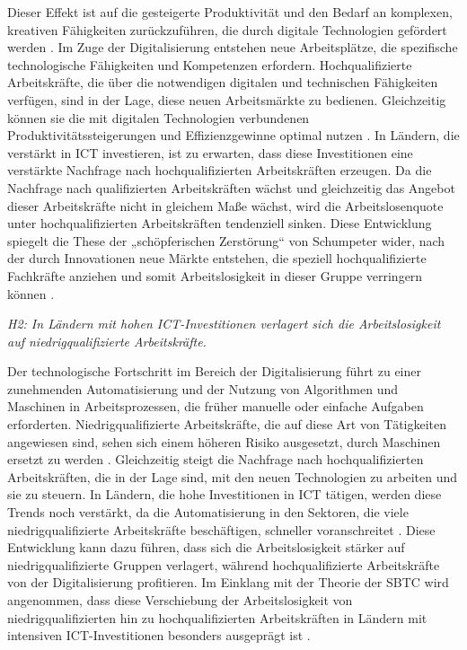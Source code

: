 Dieser Effekt ist auf die gesteigerte Produktivität und den Bedarf an komplexen, kreativen 
Fähigkeiten zurückzuführen, die durch digitale Technologien gefördert werden 
\parencite[vgl.][S. 5–8]{acemoglu2002technical}. Im Zuge der Digitalisierung entstehen neue 
Arbeitsplätze, die spezifische technologische Fähigkeiten und Kompetenzen erfordern. 
Hochqualifizierte Arbeitskräfte, die über die notwendigen digitalen und technischen 
Fähigkeiten verfügen, sind in der Lage, diese neuen Arbeitsmärkte zu bedienen. Gleichzeitig 
können sie die mit digitalen Technologien verbundenen Produktivitätssteigerungen und 
Effizienzgewinne optimal nutzen \parencite[vgl.][Kap. 2]{brynjolfsson2014thesecond}. In 
Ländern, die verstärkt in \ac{ICT} investieren, ist zu erwarten, dass diese Investitionen 
eine verstärkte Nachfrage nach hochqualifizierten Arbeitskräften erzeugen. Da die Nachfrage 
nach qualifizierten Arbeitskräften wächst und gleichzeitig das Angebot dieser Arbeitskräfte 
nicht in gleichem Maße wächst, wird die Arbeitslosenquote unter hochqualifizierten 
Arbeitskräften tendenziell sinken. Diese Entwicklung spiegelt die These der „schöpferischen 
Zerstörung“ von Schumpeter wider, nach der durch Innovationen neue Märkte entstehen, die 
speziell hochqualifizierte Fachkräfte anziehen und somit Arbeitslosigkeit in dieser Gruppe 
verringern können \parencite[vgl.][S. 103–106]{schumpeter1976capitalism}.

\textit{H2: In Ländern mit hohen \ac{ICT}-Investitionen verlagert sich die Arbeitslosigkeit 
auf niedrigqualifizierte Arbeitskräfte.}

Der technologische Fortschritt im Bereich der Digitalisierung führt zu einer zunehmenden 
Automatisierung und der Nutzung von Algorithmen und Maschinen in Arbeitsprozessen, die 
früher manuelle oder einfache Aufgaben erforderten. Niedrigqualifizierte Arbeitskräfte, die 
auf diese Art von Tätigkeiten angewiesen sind, sehen sich einem höheren Risiko ausgesetzt, 
durch Maschinen ersetzt zu werden \parencite[vgl.][S. 5–10]{autor2015whyare}. Gleichzeitig 
steigt die Nachfrage nach hochqualifizierten Arbeitskräften, die in der Lage sind, mit den 
neuen Technologien zu arbeiten und sie zu steuern. In Ländern, die hohe Investitionen in 
\ac{ICT} tätigen, werden diese Trends noch verstärkt, da die Automatisierung in den 
Sektoren, die viele niedrigqualifizierte Arbeitskräfte beschäftigen, schneller 
voranschreitet \parencite[vgl.][S. 254]{frey2013thefuture}. Diese Entwicklung kann dazu 
führen, dass sich die Arbeitslosigkeit stärker auf niedrigqualifizierte Gruppen verlagert, 
während hochqualifizierte Arbeitskräfte von der Digitalisierung profitieren. Im Einklang 
mit der Theorie der \ac{SBTC} wird angenommen, dass diese Verschiebung der Arbeitslosigkeit 
von niedrigqualifizierten hin zu hochqualifizierten Arbeitskräften in Ländern mit 
intensiven \ac{ICT}-Investitionen besonders ausgeprägt ist 
\parencite[vgl.][S. 3]{acemoglu2019robots}.

